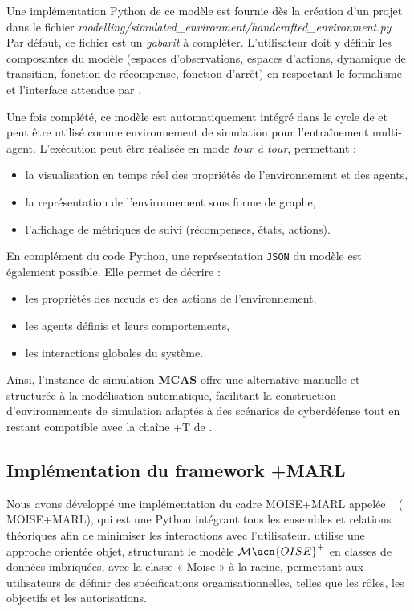 Une implémentation Python de ce modèle est fournie dès la création d’un projet dans le fichier
\textit{modelling/simulated\_environment/handcrafted\_environment.py}
Par défaut, ce fichier est un \textit{gabarit} à compléter. L’utilisateur doit y définir les composantes du modèle (espaces d’observations, espaces d’actions, dynamique de transition, fonction de récompense, fonction d’arrêt) en respectant le formalisme  et l’interface attendue par .


Une fois complété, ce modèle est automatiquement intégré dans le cycle de  et peut être utilisé comme environnement de simulation pour l’entraînement multi-agent. L’exécution peut être réalisée en mode \textit{tour à tour}, permettant :
\begin{itemize}
  \item la visualisation en temps réel des propriétés de l’environnement et des agents,
  \item la représentation de l’environnement sous forme de graphe,
  \item l’affichage de métriques de suivi (récompenses, états, actions).
\end{itemize}
En complément du code Python, une représentation \texttt{JSON} du modèle est également possible. Elle permet de décrire :
\begin{itemize}
  \item les propriétés des nœuds et des actions de l’environnement,
  \item les agents définis et leurs comportements,
  \item les interactions globales du système.
\end{itemize}

\medskip
Ainsi, l'instance de simulation \textbf{MCAS} offre une alternative manuelle et structurée à la modélisation automatique, facilitant la construction d’environnements de simulation adaptés à des scénarios de cyberdéfense tout en restant compatible avec la chaîne +T de .

\subsection{Implémentation du framework +MARL}

Nous avons développé une implémentation du cadre MOISE+MARL appelée ~\hyperref[fn:github]{\footnotemark[2]} ( MOISE+MARL), qui est une  Python intégrant tous les ensembles et relations théoriques afin de minimiser les interactions avec l'utilisateur.  utilise une approche orientée objet, structurant le modèle $\mathcal{M}\acn{OISE}^+$ en classes de données imbriquées, avec la classe « Moise » à la racine, permettant aux utilisateurs de définir des spécifications organisationnelles, telles que les rôles, les objectifs et les autorisations.


